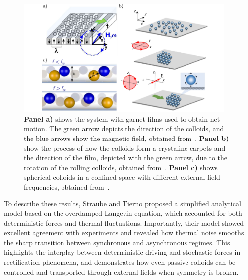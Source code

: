 \begin{figure}
  \begin{center}
    \includegraphics[width=0.95\textwidth]{figures/magneticallydrivencolloids.pdf}
  \end{center}
  \caption[Magnetically driven colloids examples.]{\textbf{Panel a)} shows the system with garnet films used to obtain net motion. The green arrow depicts the direction of the colloids, and the blue arrows show the magnetic field, obtained from~\cite{tierno2012depinning}. \textbf{Panel b)} show the process of how the colloids form a crystaline carpets and the direction of the film, depicted with the green arrow, due to the rotation of the rolling colloids, obtained from~\cite{massana2019tunable}. \textbf{Panel c)} shows spherical colloids in a confined space with different external field frequencies, obtained from~\cite{massana2020emergent}.}\label{fig:magneticallydrivencolloidalsystems}
\end{figure}


To describe these results, Straube and Tierno proposed a simplified analytical model based on the overdamped Langevin equation, which accounted for both deterministic forces and thermal fluctuations. Importantly, their model showed excellent agreement with experiments and revealed how thermal noise smooths the sharp transition between synchronous and asynchronous regimes. This highlights the interplay between deterministic driving and stochastic forces in rectification phenomena, and demonstrates how even passive colloids can be controlled and transported through external fields when symmetry is broken.

